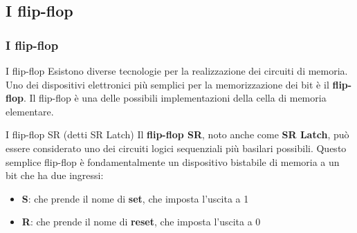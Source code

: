 \subsection[I flip-flop]{I flip-flop}
\begin{frame}
	\frametitle{I flip-flop}
	
	\begin{block}{I flip-flop}
		Esistono diverse tecnologie per la realizzazione dei circuiti di memoria. Uno dei dispositivi elettronici più semplici per la memorizzazione dei bit è il \textbf{flip-flop}. Il flip-flop è una delle possibili implementazioni della cella di memoria elementare.		
	\end{block}
	
	\begin{block}{I flip-flop SR (detti SR Latch)}
		Il \textbf{flip-flop SR}, noto anche come \textbf{SR Latch}, può essere considerato uno dei circuiti logici sequenziali più basilari possibili. Questo semplice flip-flop è fondamentalmente un dispositivo bistabile di memoria a un bit che ha due ingressi:
		\begin{itemize}
			\item \textbf{S}: che prende il nome di \textbf{set}, che imposta l'uscita a 1
			\item \textbf{R}: che prende il nome di \textbf{reset}, che imposta l'uscita a 0
		\end{itemize}
	\end{block}
	
\end{frame}



